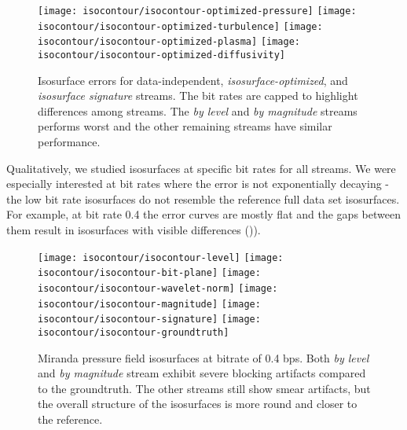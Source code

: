 \begin{figure}[t]
	\centering
	{\texttt{[image: isocontour/isocontour-optimized-pressure]}}
	{\texttt{[image: isocontour/isocontour-optimized-turbulence]}}
	{\texttt{[image: isocontour/isocontour-optimized-plasma]}}
	{\texttt{[image: isocontour/isocontour-optimized-diffusivity]}}
	\caption{Isosurface errors for data-independent, \emph{isosurface-optimized}, and {\em isosurface
	signature} streams. The bit rates are capped to highlight differences among streams. The {\em by
	level} and {\em by magnitude} streams performs worst and the other remaining streams have similar
	performance.}\label{fig:isocontour-plots}
\end{figure}

Qualitatively, we studied isosurfaces at specific bit rates for all streams. We were especially
interested at bit rates where the error is not exponentially decaying - the low bit rate isosurfaces
do not resemble the reference full data set isosurfaces. For example, at bit rate 0.4 the error
curves are mostly flat and the gaps between them result in isosurfaces with visible differences
()).

\begin{figure}[t]
	\centering
	{\texttt{[image: isocontour/isocontour-level]}}
	{\texttt{[image: isocontour/isocontour-bit-plane]}}
	{\texttt{[image: isocontour/isocontour-wavelet-norm]}}
	{\texttt{[image: isocontour/isocontour-magnitude]}}
	{\texttt{[image: isocontour/isocontour-signature]}}
	{\texttt{[image: isocontour/isocontour-groundtruth]}}
	\caption{Miranda pressure field isosurfaces at bitrate of 0.4 bps. Both {\em by level}
        and {\em by magnitude} stream exhibit severe blocking artifacts compared to the groundtruth.
        The other streams still show smear artifacts, but the overall structure of the isosurfaces
        is more round and closer to the reference.}
	\label{fig:isocontour-surfaces}
\end{figure}

